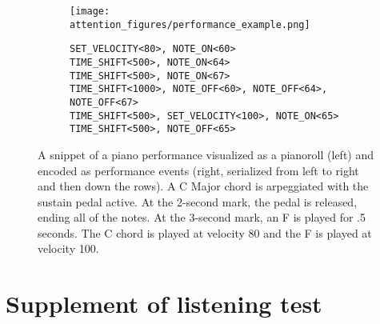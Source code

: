 \documentclass{article} \usepackage{iclr2019_conference,times}
\begin{document}
\begin{figure}[h]
    \centering
    \begin{subfigure}{.4\textwidth}
      \centering
      \texttt{[image: attention\_figures/performance\_example.png]}
    \end{subfigure}\hspace{0.03in}
    \begin{subfigure}{.57\textwidth}
\scriptsize
        \texttt{SET\_VELOCITY<80>, NOTE\_ON<60> \\
            TIME\_SHIFT<500>, NOTE\_ON<64> \\
            TIME\_SHIFT<500>, NOTE\_ON<67> \\
            TIME\_SHIFT<1000>, NOTE\_OFF<60>, NOTE\_OFF<64>, NOTE\_OFF<67> \\
            TIME\_SHIFT<500>, SET\_VELOCITY<100>, NOTE\_ON<65> \\
            TIME\_SHIFT<500>, NOTE\_OFF<65>}
        
    \end{subfigure}
    
    
  \caption{A snippet of a piano performance visualized as a pianoroll (left) and encoded as performance events (right, serialized from left to right and then down the rows). A C Major chord is arpeggiated with the sustain pedal active. At the 2-second mark, the pedal is released, ending all of the notes. At the 3-second mark, an F is played for .5 seconds. The C chord is played at velocity 80 and the F is played at velocity 100.}
\label{figure:performance}
\end{figure}


\section{Supplement of listening test}
\label{appendix:listening}
\end{document}
